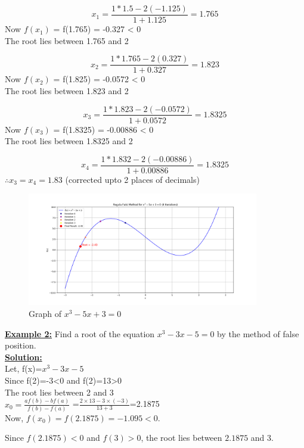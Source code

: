 \documentclass[12pt,a4paper]{article}
\begin{document}
	\[
	x_1 = \frac{1*1.5 - 2(-1.125)}{1+1.125} = 1.765
	\]
	Now \(f(x_1)\) = f(1.765) = -0.327 < 0 \\
	The root lies between 1.765 and 2
	
	\[
	x_2 = \frac{1*1.765 - 2(0.327)}{1+0.327} =1.823
	\]
	Now \(f(x_2)\) = f(1.825) = -0.0572 < 0 \\
	The root lies between 1.823 and 2
	
	\[
	x_3 = \frac{1*1.823 - 2(-0.0572)}{1+0.0572} =1.8325
	\]
	Now \(f(x_3)\) = f(1.8325) = -0.00886 < 0 \\
	The root lies between 1.8325 and 2
	
	\[
	x_4 = \frac{1*1.832 - 2(-0.00886)}{1+0.00886} =1.8325
	\]
	$\therefore x_3 = x_4 = 1.83$ (corrected upto 2 places of decimals)
	
	\begin{figure}[h]
		\centering
		\includegraphics[width=0.9\textwidth]{regula_falsi_ex1.png} %
		\caption{Graph of $x^3 - 5x + 3 = 0$}
		\label{fig:your_label_here}
	\end{figure} 
	\newpage
	
	
	\textbf{\underline{Example 2:}} Find a root of the equation $x^3-3x-5=0$ by the method of false position. \\
	
	\textbf{\underline{Solution:}}\\ Let,
	f(x)=$x^3-3x-5$\\
	Since f(2)=-3<0 and f(2)=13>0 \\
	The root lies between 2 and 3 \\
	
	
	
	$x_0=\frac{af(b)-bf(a)}{f(b)-f(a)}$
	=$\frac{2\times13-3\times(-3)}{13+3}$=2.1875\\
	
	Now, $f(x_0) = f(2.1875) = -1.095 < 0$.
	
	Since $f(2.1875) < 0$ and $f(3) > 0$, the root lies between $2.1875$ and $3$.
	
\end{document}
